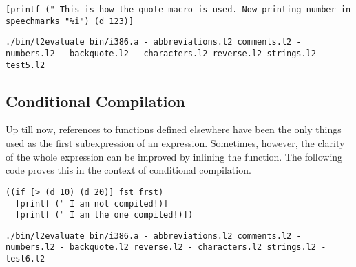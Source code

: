 \documentclass[twocolumn,landscape]{article}
\begin{document}
      \begin{lstlisting}[caption={test5.l2}]
[printf (" This is how the quote macro is used. Now printing number in speechmarks "%i") (d 123)]
      \end{lstlisting}
      
      \begin{lstlisting}[caption={shell}]
./bin/l2evaluate bin/i386.a - abbreviations.l2 comments.l2 - numbers.l2 - backquote.l2 - characters.l2 reverse.l2 strings.l2 - test5.l2
      \end{lstlisting}

    \subsection{Conditional Compilation}\label{sec:conditional-compilation}
      Up till now, references to functions defined elsewhere have been the only things used as the first subexpression of an expression. Sometimes, however, the clarity of the whole expression can be improved by inlining the function. The following code proves this in the context of conditional compilation.
      
      \begin{lstlisting}[caption={test6.l2}]
((if [> (d 10) (d 20)] fst frst)
  [printf (" I am not compiled!)]
  [printf (" I am the one compiled!)])
      \end{lstlisting}
      
      \begin{lstlisting}[caption={shell}]
./bin/l2evaluate bin/i386.a - abbreviations.l2 comments.l2 - numbers.l2 - backquote.l2 reverse.l2 - characters.l2 strings.l2 - test6.l2
      \end{lstlisting}
\end{document}

